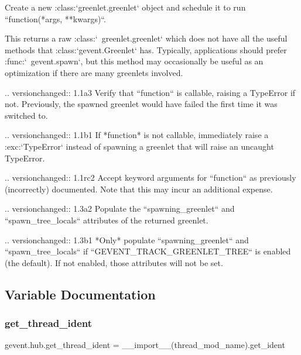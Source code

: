 \begin{DoxyVerb}Create a new :class:`greenlet.greenlet` object and schedule it to
run ``function(*args, **kwargs)``.

This returns a raw :class:`~greenlet.greenlet` which does not have all the useful
methods that :class:`gevent.Greenlet` has. Typically, applications
should prefer :func:`~gevent.spawn`, but this method may
occasionally be useful as an optimization if there are many
greenlets involved.

.. versionchanged:: 1.1a3
    Verify that ``function`` is callable, raising a TypeError if not. Previously,
    the spawned greenlet would have failed the first time it was switched to.

.. versionchanged:: 1.1b1
   If *function* is not callable, immediately raise a :exc:`TypeError`
   instead of spawning a greenlet that will raise an uncaught TypeError.

.. versionchanged:: 1.1rc2
    Accept keyword arguments for ``function`` as previously (incorrectly)
    documented. Note that this may incur an additional expense.

.. versionchanged:: 1.3a2
   Populate the ``spawning_greenlet`` and ``spawn_tree_locals``
   attributes of the returned greenlet.

.. versionchanged:: 1.3b1
   *Only* populate ``spawning_greenlet`` and ``spawn_tree_locals``
   if ``GEVENT_TRACK_GREENLET_TREE`` is enabled (the default). If not enabled,
   those attributes will not be set.\end{DoxyVerb}
 

\subsection{Variable Documentation}
\mbox{\label{namespacegevent_1_1hub_a25afe960c9af2c46325de894129e1ed2}} 
\subsubsection{\texorpdfstring{get\+\_\+thread\+\_\+ident}{get\_thread\_ident}}
{\footnotesize\ttfamily gevent.\+hub.\+get\+\_\+thread\+\_\+ident = \+\_\+\+\_\+import\+\_\+\+\_\+(thread\+\_\+mod\+\_\+name).get\+\_\+ident}

\mbox{\label{namespacegevent_1_1hub_aa8f1583d65977ad5d085a66b354a9485}} 
